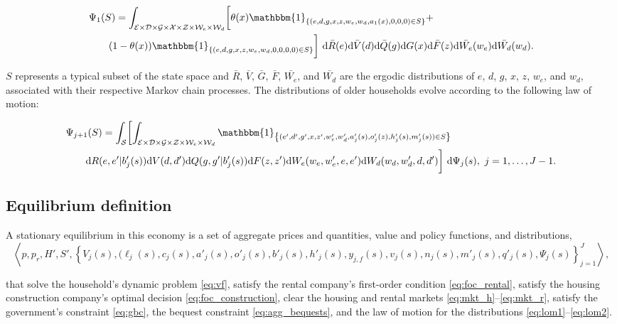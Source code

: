 \documentclass[parskip=full]{article}
\newcommand{\indicator}[1]{\mathbbm{1}_{\left\{ {#1} \right\} }}
\begin{document}
\begin{align}\label{eq:lom1}
    & \Psi_1(S) = \int_{\mathcal{E}\times \mathcal{D}\times \mathcal{G} \times \mathcal{X}\times \mathcal{Z}\times \mathcal{W}_{e}\times \mathcal{W}_{d}}\biggl[\theta(x)\indicator{(e,d,g,x,z,w_{e},w_{d},a_1(x),0,0,0)\in S} + \\
    & \qquad (1-\theta(x))\indicator{(e,d,g,x,z,w_{e},w_{d},0,0,0,0)\in S}\biggl]\ \mathrm{d}\bar{R}(e)\mathrm{d}\bar{V}(d)\mathrm{d}\bar{Q}(g)\mathrm{d}G(x) \mathrm{d}\bar{F}(z)\mathrm{d}\bar{W_{e}}(w_{e})\mathrm{d}\bar{W_{d}}(w_{d}). \notag
\end{align}

\noindent $S$ represents a typical subset of the state space and $\bar{R}$, $\bar{V}$, $\bar{G}$, $\bar{F}$, $\bar{W_{e}}$, and $\bar{W_{d}}$ are the ergodic distributions of $e$, $d$, $g$, $x$, $z$, $w_{e}$, and $w_{d}$, associated with their respective Markov chain processes. The distributions of older households evolve according to the following law of motion:

\begin{align}\label{eq:lom2}
    & \Psi_{j+1}(S) = \int_{\mathcal{S}} \biggl[\int_{\mathcal{E}\times \mathcal{D}\times \mathcal{G}\times \mathcal{Z} \times \mathcal{W}_{e}\times \mathcal{W}_{d}}\indicator{ (e',d',g',x,z',w_{e}',w_{d}',a'_j(s),o'_j(z),h'_j(s),m'_j(s))\in S }\ \\ & \qquad \mathrm{d}R(e,e'|b'_{j}(s))\mathrm{d}V(d,d')\mathrm{d}Q(g,g'|b'_{j}(s))\mathrm{d}F(z,z')\mathrm{d}W_{e}(w_{e},w_{e}',e,e')\mathrm{d}W_{d}(w_{d},w_{d}',d,d')\biggl]\ \mathrm{d}\Psi_j(s),\ j=1,\ldots,J-1. \notag
\end{align}

\subsection{Equilibrium definition}\label{subsection: equilibrium_defintion}

A stationary equilibrium in this economy is a set of aggregate prices and quantities, value and policy functions, and distributions,
\begin{equation}
    \left\langle p,p_{r},H',S',\left\{V_{j}(s),(\ell_{j}(s),c_{j}(s),a'_{j}(s),o'_{j}(s),b'_{j}(s),h'_{j}(s),y_{j,f}(s),v_{j}(s),n_j(s),m'_{j}(s),q'_j(s),\Psi_j(s)\right\}_{j=1}^J\right\rangle,
\end{equation}

\noindent that solve the household's dynamic problem \eqref{eq:vf}, satisfy the rental company's first-order condition \eqref{eq:foc_rental}, satisfy the housing construction company's optimal decision \eqref{eq:foc_construction}, clear the housing and rental markets \eqref{eq:mkt_h}--\eqref{eq:mkt_r}, satisfy the government's constraint \eqref{eq:gbc}, the bequest constraint \eqref{eq:agg_bequests}, and the law of motion for the distributions \eqref{eq:lom1}--\eqref{eq:lom2}.
\end{document}
